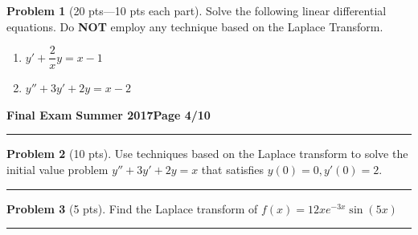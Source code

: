 \documentclass[12pt]{article}
\theoremstyle{definition}
\newtheorem{problem}{Problem}
\begin{document}
\bigskip
\begin{problem}[20 pts---10 pts each part]
Solve the following linear differential equations.  \newline Do \textbf{NOT} employ any technique based on the Laplace Transform.
\begin{enumerate}
  \item $y'+ \dfrac{2}{x} y = x-1$
  \vspace{7cm}
  \begin{flushright}
  \end{flushright}
  \item $y''+3y'+2y=x-2$
  \vspace{9.5cm}
  \begin{flushright}
  \end{flushright}
\end{enumerate}
\end{problem} 

\newpage

\hfill{\large\bf Final Exam}\hfill{\large\bf
Summer 2017}\hfill{\large\bf Page 4/10}\hrule

\bigskip
\begin{problem}[10 pts]
Use techniques based on the Laplace transform to solve the initial value problem $y''+3y'+2y=x$ that satisfies $y(0)=0, y'(0)=2$.
\vspace{8cm}
\begin{flushright}
\end{flushright}
\end{problem}
\hrule

\begin{problem}[5 pts]
Find the Laplace transform of $f(x) = 12x e^{-3x} \sin(5x)$
\vspace{3cm}

\begin{flushright}
\end{flushright}
\end{problem}
\hrule
\end{document}
